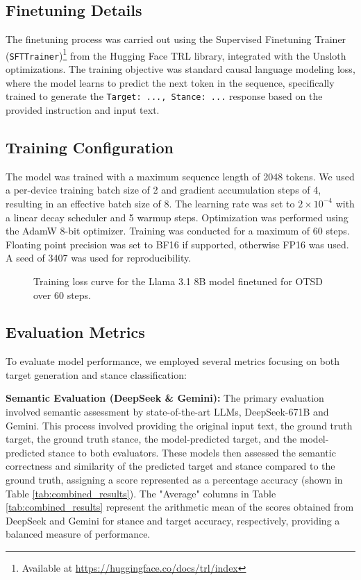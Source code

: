 \documentclass[twocolumn,11pt,letterpaper]{article}
\begin{document}
\subsection{Finetuning Details}
\label{sec:finetuning}

The finetuning process was carried out using the Supervised Finetuning Trainer (\texttt{SFTTrainer})\footnote{Available at \url{https://huggingface.co/docs/trl/index}} from the Hugging Face TRL library, integrated with the Unsloth optimizations. The training objective was standard causal language modeling loss, where the model learns to predict the next token in the sequence, specifically trained to generate the \texttt{Target: ..., Stance: ...} response based on the provided instruction and input text.

\subsection{Training Configuration}
The model was trained with a maximum sequence length of 2048 tokens. We used a per-device training batch size of 2 and gradient accumulation steps of 4, resulting in an effective batch size of 8. The learning rate was set to $2 \times 10^{-4}$ with a linear decay scheduler and 5 warmup steps. Optimization was performed using the AdamW 8-bit optimizer. Training was conducted for a maximum of 60 steps. Floating point precision was set to BF16 if supported, otherwise FP16 was used. A seed of 3407 was used for reproducibility.

\begin{figure}[htbp]
\centering

\caption{Training loss curve for the Llama 3.1 8B model finetuned for OTSD over 60 steps.}
\label{fig:training_loss}
\end{figure}

\subsection{Evaluation Metrics}
\label{sec:eval_metrics}
To evaluate model performance, we employed several metrics focusing on both target generation and stance classification:

\textbf{Semantic Evaluation (DeepSeek \& Gemini):} The primary evaluation involved semantic assessment by state-of-the-art LLMs, DeepSeek-671B and Gemini. This process involved providing the original input text, the ground truth target, the ground truth stance, the model-predicted target, and the model-predicted stance to both evaluators. These models then assessed the semantic correctness and similarity of the predicted target and stance compared to the ground truth, assigning a score represented as a percentage accuracy (shown in Table \ref{tab:combined_results}). The "Average" columns in Table \ref{tab:combined_results} represent the arithmetic mean of the scores obtained from DeepSeek and Gemini for stance and target accuracy, respectively, providing a balanced measure of performance.
\end{document}
